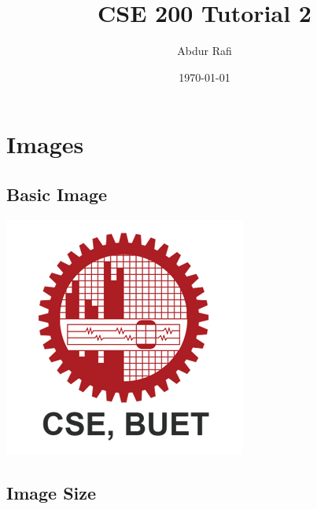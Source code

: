 \documentclass[twocolumn]{article}
\title{CSE 200 Tutorial 2}
\author{Abdur Rafi}
\date{\today}
\begin{document}
\maketitle
\tableofcontents
\listoffigures

\pagebreak

\section{Images}

\subsection{Basic Image}


\includegraphics[]{Images/CSE_BUET.png}


\pagebreak


\subsection{Image Size}
\end{document}
